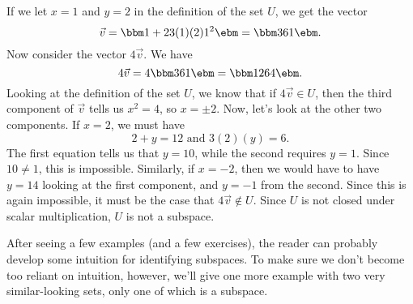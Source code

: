 {\begin{enumerate}

If we let $x=1$ and $y=2$ in the definition of the set $U$, we get the vector
\[
\vec v = \bbm 1+2\\3(1)(2)\\1^2\ebm = \bbm 3\\6\\1\ebm.
\]
Now consider the vector $4\vec v$. We have
\[
4\vec v = 4\bbm 3\\6\\1\ebm = \bbm 12\\6\\4\ebm.
\]
Looking at the definition of the set $U$, we know that if $4\vec v\in U$, then the third component of $\vec v$ tells us $x^2=4$, so $x=\pm 2$. Now, let's look at the other two components. If $x=2$, we must have
\[
2+y = 12 \text{ and } 3(2)(y) = 6.
\]
The first equation tells us that $y=10$, while the second requires $y=1$. Since $10\neq 1$, this is impossible. Similarly, if $x=-2$, then we would have to have $y=14$ looking at the first component, and $y=-1$ from the second. Since this is again impossible, it must be the case that $4\vec v\notin U$. Since $U$ is not closed under scalar multiplication, $U$ is not a subspace.
\end{enumerate}}

\medskip

After seeing a few examples (and a few exercises), the reader can probably develop some intuition for identifying subspaces. To make sure we don't become too reliant on intuition, however, we'll give one more example with two very similar-looking sets, only one of which is a subspace.

\medskip

